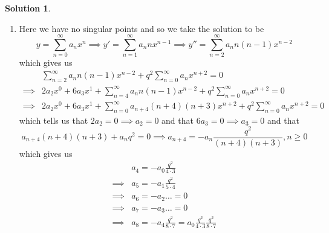 \documentclass[10pt]{article}
\theoremstyle{definition}
\newtheorem{soln}{Solution}
\begin{document}
\begin{soln}
\begin{enumerate}[label=(\alph*)]
\begin{enumerate}[label=\roman*.]
\begin{align*}
                  \end{align*}
                  which for my student number becomes
                  \begin{align*}
                             & a_{1}=45a_0     \\
                    \implies & a_{2}=675a_0    \\
                    \implies & a_{3}=5775a_0   \\
                    \implies & a_{4}=34650a_0.
                  \end{align*}
                  Since the nearest singular point to $x=0$ other than itself is $x=1$, the series is guaranteed to converge for $0<x<1$.
            \item Here we have no singular points and so we take the solution to be
                  $$y=\sum_{n=0}^\infty a_nx^n\implies y'=\sum_{n=1}^\infty a_nnx^{n-1}\implies y''=\sum_{n=2}^\infty a_nn(n-1)x^{n-2}$$
                  which gives us
                  \begin{align*}
                             & \sum_{n=2}^\infty a_nn(n-1)x^{n-2} + q^2\sum_{n=0}^\infty a_nx^{n+2} = 0                             \\
                    \implies & 2a_2x^{0}+6a_3x^{1}+\sum_{n=4}^\infty a_nn(n-1)x^{n-2} + q^2\sum_{n=0}^\infty a_nx^{n+2} = 0         \\
                    \implies & 2a_2x^{0}+6a_3x^{1}+\sum_{n=0}^\infty a_{n+4}(n+4)(n+3)x^{n+2} + q^2\sum_{n=0}^\infty a_nx^{n+2} = 0
                  \end{align*}
                  which tells us that
                  $2a_2=0\implies a_2=0$ and that $6a_3=0\implies a_3=0$ and that
                  $$a_{n+4}(n+4)(n+3)+a_nq^2=0\implies a_{n+4}=-a_n\frac{q^2}{(n+4)(n+3)}, n\geq 0$$
                  which gives us
                  \begin{align*}
                             & a_4=-a_0\frac{q^2}{4\cdot 3}                                               \\
                    \implies & a_{5}=-a_1\frac{q^2}{5\cdot 4}                                             \\
                    \implies & a_{6}=-a_2\dots=0                                                          \\
                    \implies & a_{7}=-a_3\dots=0                                                          \\
                    \implies & a_{8}=-a_4\frac{q^2}{8\cdot 7}=a_0\frac{q^2}{4\cdot 3}\frac{q^2}{8\cdot 7} \\

\end{align*}
\end{enumerate}
\end{enumerate}
\end{soln}
\end{document}
